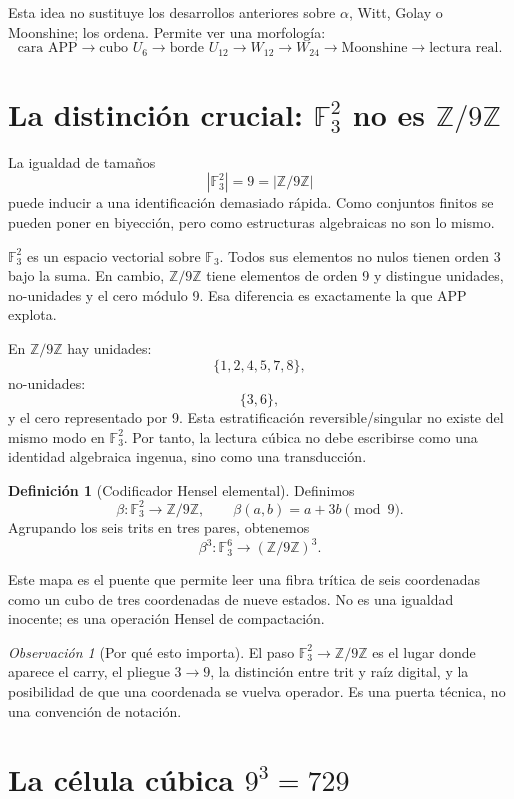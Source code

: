 \documentclass[11pt,a4paper]{article}
\theoremstyle{definition}
\newtheorem{definicion}[teorema]{Definición}
\theoremstyle{remark}
\newtheorem{observacion}[teorema]{Observación}
\newcommand{\F}{\mathbb F}
\newcommand{\Z}{\mathbb Z}
\begin{document}
Esta idea no sustituye los desarrollos anteriores sobre \(\alpha\), Witt, Golay o Moonshine; los ordena. Permite ver una morfología:
\[
\boxed{
\text{cara APP}\to \text{cubo }U_6\to \text{borde }U_{12}\to W_{12}\to W_{24}\to \text{Moonshine}\to \text{lectura real}.
}
\]

\section{La distinción crucial: \(\F_3^2\) no es \(\Z/9\Z\)}

La igualdad de tamaños
\[
|\F_3^2|=9=|\Z/9\Z|
\]
puede inducir a una identificación demasiado rápida. Como conjuntos finitos se pueden poner en biyección, pero como estructuras algebraicas no son lo mismo.

\(\F_3^2\) es un espacio vectorial sobre \(\F_3\). Todos sus elementos no nulos tienen orden 3 bajo la suma. En cambio, \(\Z/9\Z\) tiene elementos de orden 9 y distingue unidades, no-unidades y el cero módulo 9. Esa diferencia es exactamente la que APP explota.

En \(\Z/9\Z\) hay unidades:
\[
\{1,2,4,5,7,8\},
\]
no-unidades:
\[
\{3,6\},
\]
y el cero representado por 9. Esta estratificación reversible/singular no existe del mismo modo en \(\F_3^2\). Por tanto, la lectura cúbica no debe escribirse como una identidad algebraica ingenua, sino como una transducción.

\begin{definicion}[Codificador Hensel elemental]
Definimos
\[
\beta:\F_3^2\longrightarrow \Z/9\Z,
\qquad
\beta(a,b)=a+3b\pmod9.
\]
Agrupando los seis trits en tres pares, obtenemos
\[
\beta^3:\F_3^6\longrightarrow(\Z/9\Z)^3.
\]
\end{definicion}

Este mapa es el puente que permite leer una fibra trítica de seis coordenadas como un cubo de tres coordenadas de nueve estados. No es una igualdad inocente; es una operación Hensel de compactación.

\begin{observacion}[Por qué esto importa]
El paso \(\F_3^2\to\Z/9\Z\) es el lugar donde aparece el carry, el pliegue \(3\to9\), la distinción entre trit y raíz digital, y la posibilidad de que una coordenada se vuelva operador. Es una puerta técnica, no una convención de notación.
\end{observacion}

\section{La célula cúbica \(9^3=729\)}
\end{document}
